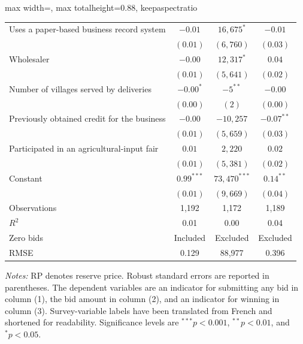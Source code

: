 \documentclass[11pt]{article}
\begin{document}
\begin{table}[!htbp]
\begin{adjustbox}{max width=\textwidth,
                  max totalheight=0.88\textheight,
                  keepaspectratio}
\begin{threeparttable}
\begin{tabular}{lccc}
Uses a paper-based business record system
    & $-0.01$
    & $16{,}675^{*}$
    & $-0.01$ \\
    & $(0.01)$
    & $(6{,}760)$
    & $(0.03)$ \\

Wholesaler
    & $-0.00$
    & $12{,}317^{*}$
    & $0.04$ \\
    & $(0.01)$
    & $(5{,}641)$
    & $(0.02)$ \\

Number of villages served by deliveries
    & $-0.00^{*}$
    & $-5^{**}$
    & $-0.00$ \\
    & $(0.00)$
    & $(2)$
    & $(0.00)$ \\

Previously obtained credit for the business
    & $-0.00$
    & $-10{,}257$
    & $-0.07^{**}$ \\
    & $(0.01)$
    & $(5{,}659)$
    & $(0.03)$ \\

Participated in an agricultural-input fair
    & $0.01$
    & $2{,}220$
    & $0.02$ \\
    & $(0.01)$
    & $(5{,}381)$
    & $(0.02)$ \\

\addlinespace
Constant
    & $0.99^{***}$
    & $73{,}470^{***}$
    & $0.14^{**}$ \\
    & $(0.01)$
    & $(9{,}669)$
    & $(0.04)$ \\

\midrule
Observations
    & 1,192 & 1,172 & 1,189 \\
$R^{2}$
    & 0.01 & 0.00 & 0.04 \\
Zero bids
    & Included & Excluded & Excluded \\
RMSE
    & 0.129 & 88,977 & 0.396 \\
\bottomrule
\end{tabular}

\begin{tablenotes}[flushleft]
\footnotesize
\item \textit{Notes:} RP denotes reserve price. Robust standard errors are
reported in parentheses. The dependent variables are an indicator for
submitting any bid in column (1), the bid amount in column (2), and an
indicator for winning in column (3). Survey-variable labels have been
translated from French and shortened for readability. Significance levels
are $^{***}p<0.001$, $^{**}p<0.01$, and $^{*}p<0.05$.
\end{tablenotes}

\end{threeparttable}
\end{adjustbox}
\end{table}
\end{document}
